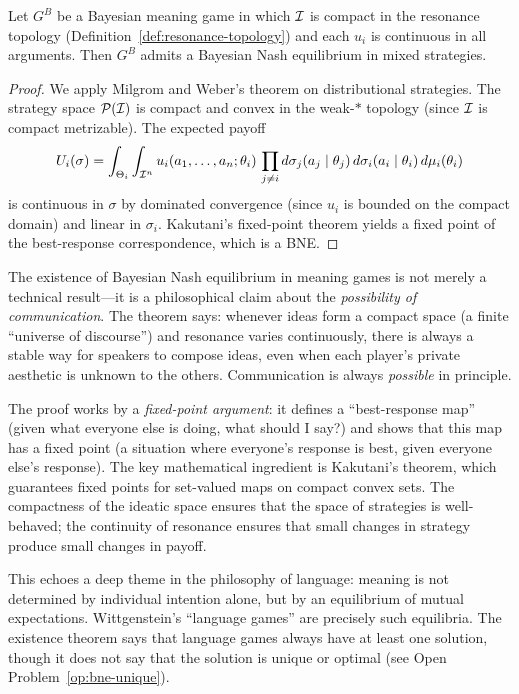 \begin{theorem}
\label{thm:bne-existence}
Let $G^B$ be a Bayesian meaning game in which $\mathcal{I}$ is compact
in the resonance topology (Definition~\ref{def:resonance-topology})
and each $u_i$ is continuous in all arguments.  Then $G^B$ admits
a Bayesian Nash equilibrium in mixed strategies.
\end{theorem}

\begin{proof}
We apply Milgrom and Weber's theorem on distributional strategies.
The strategy space $\mathcal{P}(\mathcal{I})$ is
compact and convex in the weak-$*$ topology (since $\mathcal{I}$ is compact
metrizable).  The expected payoff
\[
  U_i(\sigma)
  = \int_{\Theta_i} \int_{\mathcal{I}^n}
    u_i(a_1,\ldots,a_n;\theta_i)\,
    \prod_{j\neq i} d\sigma_j(a_j \mid \theta_j)\,
    d\sigma_i(a_i \mid \theta_i)\, d\mu_i(\theta_i)
\]
is continuous in $\sigma$ by dominated convergence (since $u_i$ is
bounded on the compact domain) and linear in $\sigma_i$.
Kakutani's fixed-point theorem yields a fixed point of the
best-response correspondence, which is a BNE.
\end{proof}

\begin{remark}
The existence of Bayesian Nash equilibrium in meaning games is not
merely a technical result---it is a philosophical claim about the
\emph{possibility of communication}.  The theorem says: whenever ideas
form a compact space (a finite ``universe of discourse'') and resonance
varies continuously, there is always a stable way for speakers to
compose ideas, even when each player's private aesthetic is unknown to
the others.  Communication is always \emph{possible} in principle.

The proof works by a \emph{fixed-point argument}: it defines a
``best-response map'' (given what everyone else is doing, what should I
say?) and shows that this map has a fixed point (a situation where
everyone's response is best, given everyone else's response).  The key
mathematical ingredient is Kakutani's theorem, which guarantees fixed
points for set-valued maps on compact convex sets.  The compactness of
the ideatic space ensures that the space of strategies is well-behaved;
the continuity of resonance ensures that small changes in strategy
produce small changes in payoff.

This echoes a deep theme in the philosophy of language: meaning is not
determined by individual intention alone, but by an equilibrium of
mutual expectations.  Wittgenstein's ``language games'' are precisely
such equilibria.  The existence theorem says that language games
always have at least one solution, though it does not say that the
solution is unique or optimal (see Open Problem~\ref{op:bne-unique}).
\end{remark}

